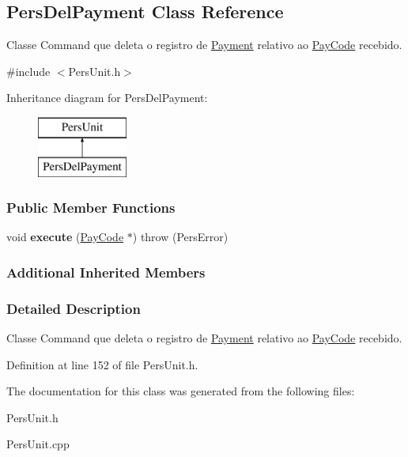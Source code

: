 \hypertarget{classPersDelPayment}{\subsection{Pers\-Del\-Payment Class Reference}
\label{da/d8c/classPersDelPayment}
}


Classe Command que deleta o registro de \hyperlink{classPayment}{Payment} relativo ao \hyperlink{classPayCode}{Pay\-Code} recebido.  




{\ttfamily \#include $<$Pers\-Unit.\-h$>$}

Inheritance diagram for Pers\-Del\-Payment\-:\begin{figure}[H]
\begin{center}
\leavevmode
\includegraphics[height=2.000000cm]{da/d8c/classPersDelPayment}
\end{center}
\end{figure}
\subsubsection*{Public Member Functions}
\begin{DoxyCompactItemize}
\item 
\hypertarget{classPersDelPayment_a92f9a6d1cdca92afb3fa71a217026864}{void {\bfseries execute} (\hyperlink{classPayCode}{Pay\-Code} $\ast$)  throw (\-Pers\-Error)}\label{da/d8c/classPersDelPayment_a92f9a6d1cdca92afb3fa71a217026864}

\end{DoxyCompactItemize}
\subsubsection*{Additional Inherited Members}


\subsubsection{Detailed Description}
Classe Command que deleta o registro de \hyperlink{classPayment}{Payment} relativo ao \hyperlink{classPayCode}{Pay\-Code} recebido. 

Definition at line 152 of file Pers\-Unit.\-h.



The documentation for this class was generated from the following files\-:\begin{DoxyCompactItemize}
\item 
Pers\-Unit.\-h\item 
Pers\-Unit.\-cpp\end{DoxyCompactItemize}
